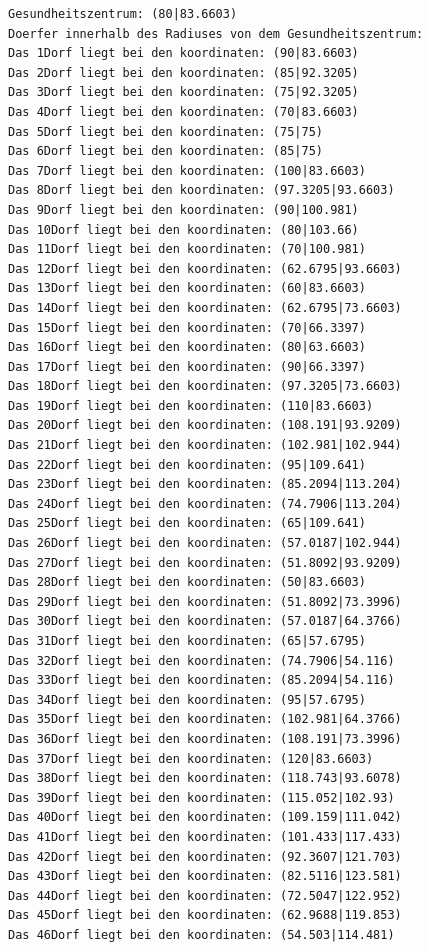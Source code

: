 \documentclass{article}
\begin{document}
\begin{verbatim}
Gesundheitszentrum: (80|83.6603)
Doerfer innerhalb des Radiuses von dem Gesundheitszentrum: 
Das 1Dorf liegt bei den koordinaten: (90|83.6603)
Das 2Dorf liegt bei den koordinaten: (85|92.3205)
Das 3Dorf liegt bei den koordinaten: (75|92.3205)
Das 4Dorf liegt bei den koordinaten: (70|83.6603)
Das 5Dorf liegt bei den koordinaten: (75|75)
Das 6Dorf liegt bei den koordinaten: (85|75)
Das 7Dorf liegt bei den koordinaten: (100|83.6603)
Das 8Dorf liegt bei den koordinaten: (97.3205|93.6603)
Das 9Dorf liegt bei den koordinaten: (90|100.981)
Das 10Dorf liegt bei den koordinaten: (80|103.66)
Das 11Dorf liegt bei den koordinaten: (70|100.981)
Das 12Dorf liegt bei den koordinaten: (62.6795|93.6603)
Das 13Dorf liegt bei den koordinaten: (60|83.6603)
Das 14Dorf liegt bei den koordinaten: (62.6795|73.6603)
Das 15Dorf liegt bei den koordinaten: (70|66.3397)
Das 16Dorf liegt bei den koordinaten: (80|63.6603)
Das 17Dorf liegt bei den koordinaten: (90|66.3397)
Das 18Dorf liegt bei den koordinaten: (97.3205|73.6603)
Das 19Dorf liegt bei den koordinaten: (110|83.6603)
Das 20Dorf liegt bei den koordinaten: (108.191|93.9209)
Das 21Dorf liegt bei den koordinaten: (102.981|102.944)
Das 22Dorf liegt bei den koordinaten: (95|109.641)
Das 23Dorf liegt bei den koordinaten: (85.2094|113.204)
Das 24Dorf liegt bei den koordinaten: (74.7906|113.204)
Das 25Dorf liegt bei den koordinaten: (65|109.641)
Das 26Dorf liegt bei den koordinaten: (57.0187|102.944)
Das 27Dorf liegt bei den koordinaten: (51.8092|93.9209)
Das 28Dorf liegt bei den koordinaten: (50|83.6603)
Das 29Dorf liegt bei den koordinaten: (51.8092|73.3996)
Das 30Dorf liegt bei den koordinaten: (57.0187|64.3766)
Das 31Dorf liegt bei den koordinaten: (65|57.6795)
Das 32Dorf liegt bei den koordinaten: (74.7906|54.116)
Das 33Dorf liegt bei den koordinaten: (85.2094|54.116)
Das 34Dorf liegt bei den koordinaten: (95|57.6795)
Das 35Dorf liegt bei den koordinaten: (102.981|64.3766)
Das 36Dorf liegt bei den koordinaten: (108.191|73.3996)
Das 37Dorf liegt bei den koordinaten: (120|83.6603)
Das 38Dorf liegt bei den koordinaten: (118.743|93.6078)
Das 39Dorf liegt bei den koordinaten: (115.052|102.93)
Das 40Dorf liegt bei den koordinaten: (109.159|111.042)
Das 41Dorf liegt bei den koordinaten: (101.433|117.433)
Das 42Dorf liegt bei den koordinaten: (92.3607|121.703)
Das 43Dorf liegt bei den koordinaten: (82.5116|123.581)
Das 44Dorf liegt bei den koordinaten: (72.5047|122.952)
Das 45Dorf liegt bei den koordinaten: (62.9688|119.853)
Das 46Dorf liegt bei den koordinaten: (54.503|114.481)

\end{verbatim}
\end{document}

